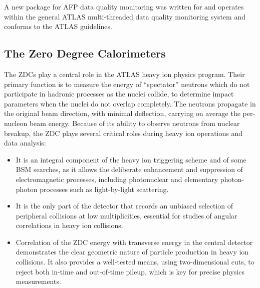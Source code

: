 \documentclass[cernpreprint, atlasdraft=false, UKenglish,british,orcidlogo, texmf, orcidlogo]{atlasdoc}
\begin{document}
A new package for \gls{AFP} data quality monitoring was written for \RunThr and operates within the general ATLAS multi-threaded data quality monitoring system and conforms to the ATLAS guidelines.
 



\subsection{The Zero Degree Calorimeters}\label{zdc}
 
The \glspl{ZDC} play a central role in the ATLAS heavy
ion physics program.  Their primary function is to measure the energy of
``spectator'' neutrons which do not participate in hadronic processes as
the nuclei collide, to determine impact parameters when the nuclei do not overlap completely.
The neutrons propagate in the original beam direction, with minimal deflection,
carrying on average the per-nucleon beam energy.
Because of its ability to observe neutrons from nuclear breakup,
the \gls{ZDC} plays several critical roles during heavy ion operations and data analysis:
\begin{itemize}
\item It is an integral component of the heavy ion triggering scheme and of some \gls{BSM} searches, as it allows the deliberate enhancement and suppression of electromagnetic processes, including photonuclear and elementary photon-photon processes such as light-by-light scattering.
\item It is the only part of the detector that records an unbiased selection of peripheral collisions at low multiplicities, essential for studies of angular correlations in heavy ion collisions.
\item Correlation of the \gls{ZDC} energy with transverse energy in the
central detector demonstrates the clear geometric nature of particle
production in heavy ion collisions. It also provides a well-tested
means, using two-dimensional cuts, to reject both in-time and
out-of-time pileup, which is key for precise physics measurements.
\end{itemize}
 
\end{document}

